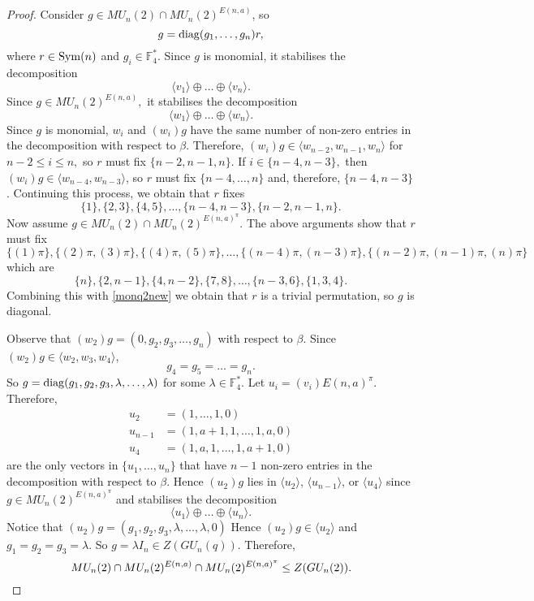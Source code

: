 \begin{proof}
\medskip

Consider $g \in MU_n(2) \cap MU_n(2)^{E(n,a)}$,  so 
\begin{equation*}
g=\mathrm{diag}(g_1, \ldots, g_n)r,
\end{equation*}
where $r \in \mathrm{Sym}(n)$ and $g_i \in \mathbb{F}_{4}^{*}$.  Since $g$ is monomial, it stabilises the decomposition
$$\langle v_1\rangle \oplus \ldots \oplus \langle v_n \rangle.$$ Since $g \in MU_n(2)^{E(n,a)},$ it stabilises the decomposition 
$$\langle w_1\rangle \oplus \ldots \oplus \langle w_n \rangle.$$ 
Since $g$ is monomial, $w_i$ and $(w_i)g$ have the same number of non-zero entries in the decomposition with respect to $\beta.$ Therefore, $(w_i)g \in \langle w_{n-2}, w_{n-1}, w_{n} \rangle$ for $n-2 \le i \le n,$ so $r$ must fix $\{n-2,n-1,n\}.$ If $i \in \{n-4,n-3\},$ then $(w_i)g \in \langle w_{n-4}, w_{n-3} \rangle$, so $r$ must fix $\{n-4,\ldots,n\}$ and, therefore, $\{n-4, n-3\}$. Continuing this process, we obtain that $r$ fixes 
\begin{equation}
\label{monq2new}
\{1\},\{2,3\},\{4,5\}, \ldots, \{n-4, n-3\}, \{n-2, n-1, n\}.
\end{equation}
Now assume $g \in MU_n(2) \cap MU_n(2)^{E(n,a)^{\pi}}$. The above arguments show that $r$ must fix
$$\{(1)\pi\},\{(2)\pi,(3)\pi\},\{(4)\pi,(5)\pi\}, \ldots, \{(n-4)\pi, (n-3)\pi\}, \{(n-2)\pi, (n-1)\pi, (n)\pi\}$$ which are
$$\{n\},\{2,n-1\},\{4,n-2\}, \{7,8\}, \ldots, \{n-3, 6\}, \{1, 3, 4\}.$$ Combining this with \eqref{monq2new} we obtain that $r$ is a trivial permutation, so $g$ is diagonal.

Observe that $(w_2)g = (0, g_2, g_3, \ldots, g_n)$ with respect to $\beta$. Since  $ (w_2)g \in \langle w_2, w_3, w_4 \rangle$, 
$$g_4 = g_5 = \ldots =g_n.$$ So $g=\mathrm{diag}(g_1, g_2, g_3, \lambda, \ldots, \lambda)$ for some $\lambda \in \mathbb{F}_4^*.$  Let $u_i = (v_i)E(n,a)^{\pi}.$ Therefore, 
\begin{align*}
u_2 & =(1, \ldots, 1, 0)\\
u_{n-1} & = (1, a+1, 1, \ldots, 1, a, 0)\\
u_{4} & = (1, a, 1, \ldots, 1, a+1, 0)
\end{align*}
are the only vectors in $\{u_1, \ldots, u_n\}$ that have $n-1$ non-zero entries in the decomposition with respect to $\beta.$ Hence  $(u_2)g$ lies in $\langle u_2\rangle$, $\langle u_{n-1}\rangle$, or $\langle u_4 \rangle$ since $g \in MU_n(2)^{E(n,a)^{\pi}}$ and stabilises the decomposition
$$\langle u_1\rangle \oplus \ldots \oplus \langle u_n \rangle.$$ Notice that  $(u_2)g= (g_1, g_2, g_3, \lambda, \ldots, \lambda,0)$  Hence $(u_2)g \in \langle u_2 \rangle$ and $g_1=g_2=g_3=\lambda.$ So $g = \lambda I_n \in  Z(GU_n(q))$. Therefore, 
\begin{equation*}
MU_n(2) \cap MU_n(2)^{E(n,a)} \cap MU_n(2)^{E(n,a)^{\pi}}\le Z(GU_n(2)). \qedhere
\end{equation*}
\end{proof}

